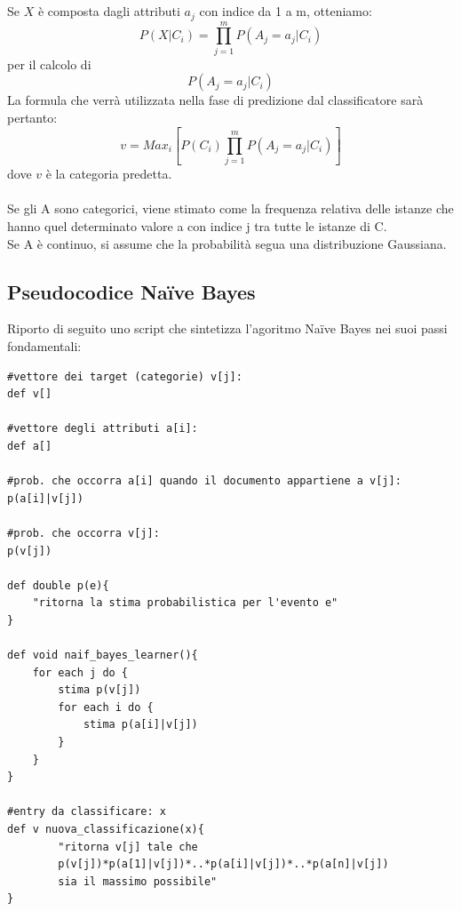 \documentclass{article}
\theoremstyle{plain}
\theoremstyle{definition}
\begin{document}
\\
\\
Se $X$ è composta dagli attributi $a_j$ con indice da 1 a m, otteniamo:
$$P(X|C_i)=\prod_{j=1}^m P(A_j=a_j|C_i)$$
per il calcolo di 
$$P(A_j=a_j|C_i)$$
La formula che verrà utilizzata nella fase di predizione dal classificatore sarà pertanto:
$$v=Max_i [P(C_i)\prod_{j=1}^m P(A_j=a_j|C_i)]$$
dove $v$ è la categoria predetta.
\\
\\
Se gli A sono categorici, viene stimato come la frequenza relativa delle istanze che hanno quel determinato valore a con indice j tra tutte le istanze di C.
\\
Se A è continuo, si assume che la probabilità segua una distribuzione Gaussiana.

\newpage
\subsection{Pseudocodice Naïve Bayes}
Riporto di seguito uno script che sintetizza l'agoritmo Naïve Bayes nei suoi passi fondamentali:

\begin{lstlisting}
#vettore dei target (categorie) v[j]:
def v[]

#vettore degli attributi a[i]:
def a[]

#prob. che occorra a[i] quando il documento appartiene a v[j]:
p(a[i]|v[j]) 

#prob. che occorra v[j]:
p(v[j])

def double p(e){
	"ritorna la stima probabilistica per l'evento e"
}

def void naif_bayes_learner(){
	for each j do {
		stima p(v[j])
		for each i do {
			stima p(a[i]|v[j])
		}
	}
}

#entry da classificare: x
def v nuova_classificazione(x){
		"ritorna v[j] tale che
		p(v[j])*p(a[1]|v[j])*..*p(a[i]|v[j])*..*p(a[n]|v[j])
		sia il massimo possibile"
}
\end{lstlisting}
\end{document}
